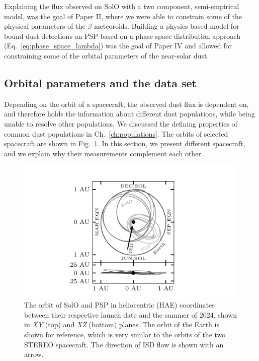 Explaining the flux observed on SolO with a two component, semi-empirical model, was the goal of Paper II, where we were able to constrain some of the physical parameters of the $\beta$ meteoroids. Building a physics based model for bound dust detections on PSP based on a phase space distribution approach (Eq.~\ref{eq:phase_space_lambda}) was the goal of Paper IV and allowed for constraining some of the orbital parameters of the near-solar dust. 

\subsection{Orbital parameters and the data set}

Depending on the orbit of a spacecraft, the observed dust flux is dependent on, and therefore holds the information about different dust populations, while being unable to resolve other populations. We discussed the defining properties of common dust populations in Ch.~\ref{ch:populations}. The orbits of selected spacecraft are shown in Fig.~\ref{fig:sc_orbits}. In this section, we present different spacecraft, and we explain why their measurements complement each other.  

\begin{figure}[h]
 	\centering
 	\includegraphics[width=13cm]{figures/solo_orbit.pdf}
 	\caption{The orbit of SolO and PSP in heliocentric (HAE) coordinates between their respective launch date and the summer of 2024, shown in \textit{XY} (top) and \textit{XZ} (bottom) planes. The orbit of the Earth is shown for reference, which is very similar to the orbits of the two STEREO spacecraft. The direction of ISD flow is shown with an arrow.}
 	\label{fig:sc_orbits}
\end{figure}

